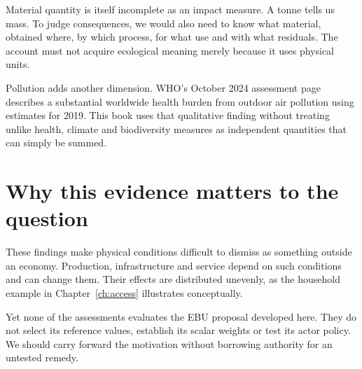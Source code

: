 Material quantity is itself incomplete as an impact measure. A tonne tells us mass. To judge consequences, we would also need to know what material, obtained where, by which process, for what use and with what residuals. The account must not acquire ecological meaning merely because it uses physical units.

Pollution adds another dimension. WHO's October 2024 assessment page describes a substantial worldwide health burden from outdoor air pollution using estimates for 2019.\cite{air} This book uses that qualitative finding without treating unlike health, climate and biodiversity measures as independent quantities that can simply be summed.

\section{Why this evidence matters to the question}
These findings make physical conditions difficult to dismiss as something outside an economy. Production, infrastructure and service depend on such conditions and can change them. Their effects are distributed unevenly, as the household example in Chapter~\ref{ch:access} illustrates conceptually.

Yet none of the assessments evaluates the EBU proposal developed here. They do not select its reference values, establish its scalar weights or test its actor policy. We should carry forward the motivation without borrowing authority for an untested remedy.


